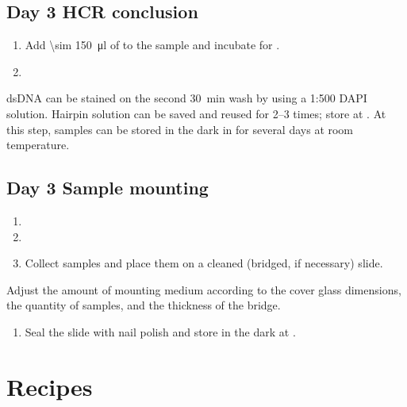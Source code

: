 \documentclass[10pt]{report}
\begin{document}
\subsection*{Day 3 \textendash{} HCR conclusion}

\begin{enumerate}[series = steps]
	\item Add \qty{\sim 150}{\ul} of \ssct to the sample and incubate for \tenmin.
	\item {}
\end{enumerate}

\bigskip\alert{dsDNA can be stained on the second \qty{30}{\minute} wash by using a 1:500 DAPI solution.}
\alert{Hairpin solution can be saved and reused for 2--3 times; store at \minustwenty.}
\alert{At this step, samples can be stored in the dark in \ssct for several days at room temperature.}

\subsection*{Day 3 \textendash{} Sample mounting}

\begin{enumerate}[series = steps]
	\item {}
	\item {}
	\item Collect samples and place them on a cleaned (bridged, if necessary) slide.
\end{enumerate}

\bigskip\alert{Adjust the amount of mounting medium according to the cover glass dimensions, the quantity of samples, and the thickness of the bridge.}

\begin{enumerate}[resume = steps]
	\item	Seal the slide with nail polish and store in the dark at \fourdegree.
\end{enumerate}

\clearpage

\section*{\textendash{} Recipes \textendash{}}
\end{document}
